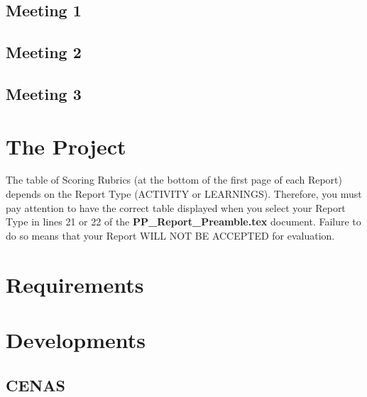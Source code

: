 \documentclass[a4paper,12pt,journal,twoside,compsoc]{PPIEEEtran}
\begin{document}
\subsection{Meeting 1}

\subsection{Meeting 2}

\subsection{Meeting 3}


\section{The Project}
The table of Scoring Rubrics (at the bottom of the first page of each Report) depends on the Report Type (ACTIVITY or LEARNINGS). Therefore, you must pay attention to have the correct table displayed when you select your Report Type in lines 21 or 22 of the \textbf{PP\_Report\_Preamble.tex} document. Failure to do so means that your Report WILL NOT BE ACCEPTED for evaluation.

\section{Requirements}



\section{Developments}
\subsection{CENAS}


\end{document}
